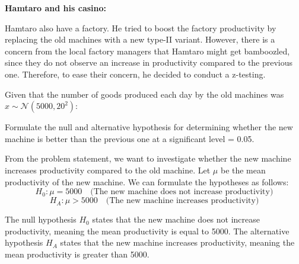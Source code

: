 \documentclass[a4paper, 10pt]{article}
\begin{document}
\newpage

\begin{tosubmit}
\problem[6]
\textbf{Hamtaro and his casino:}

\vspace{2mm}

\par\hspace{3mm} Hamtaro also have a factory.
He tried to boost the factory productivity by replacing the old machines with a new type-II variant.
However, there is a concern from the local factory managers that Hamtaro might get bamboozled, since they do not observe an increase in productivity compared to the previous one.
Therefore, to ease their concern, he decided to conduct a z-testing.

\vspace{1mm}

\par\hspace{3mm} Given that the number of goods produced each day by the old machines was \( x \sim \mathcal{N}(5000, 20^2) \):

\vspace{5mm}

\begin{subproblems}
    \item Formulate the null and alternative hypothesis for determining whether the new machine is better than the previous one at a significant level = 0.05.
\end{subproblems}

\par\noindent\submitsolution
From the problem statement, we want to investigate whether the new machine increases productivity compared to the old machine.
Let \( \mu \) be the mean productivity of the new machine.
We can formulate the hypotheses as follows:
\[ \boxed{ H_0: \mu = 5000 \quad \text{(The new machine does not increase productivity)}} \]
\[ \boxed{ H_A: \mu > 5000 \quad \text{(The new machine increases productivity)}} \]

The null hypothesis \( H_0 \) states that the new machine does not increase productivity, meaning the mean productivity is equal to 5000.
The alternative hypothesis \( H_A \) states that the new machine increases productivity, meaning the mean productivity is greater than 5000.


\end{tosubmit}
\end{document}
